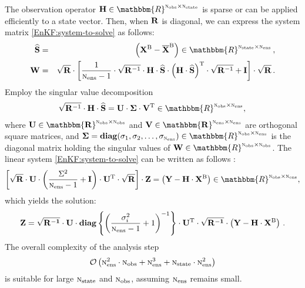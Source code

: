 \documentclass[12pt]{article}
\newcommand{\Nobs}{\textsc{n}_{{\rm obs}}}
\newcommand{\Nens}{\textsc{n}_{{\rm ens}}}
\newcommand{\Nstate}{\textsc{n}_{{\rm state}}}
\newcommand{\BO}{{\mathcal O}}
\newcommand{\XB}{{\bf X}^{\rm B}}
\newcommand{\Xmean}{{\bf \overline{X}}^{\rm B}}
\newcommand{\R}{{\bf R}}
\renewcommand{\S}{{\bf S}}
\newcommand{\Z}{{\bf Z}}
\newcommand{\Y}{{\bf Y}}
\newcommand{\Lo}{{\bf H}}
\renewcommand{\Re}{\mathbbm{R}}
\begin{document}
The observation operator $\Lo \in \Re^{\Nobs \times \Nstate}$ is sparse or can be applied efficiently to a state vector. Then, when $\R$ is diagonal, we can express the system matrix \eqref{EnKF:system-to-solve} as follows:
\begin{eqnarray}
\nonumber
\widehat{\S} &=& \left ( \XB-\Xmean \right ) \in \Re^{\Nstate \times \Nens}\,,\\
\label{EnKF:SVD-rewritten-W}
\displaystyle {\bf W} &=& \sqrt{\R} \cdot \left [ \frac{1}{\Nens-1} \cdot \sqrt{\R^{-1}} \cdot \Lo \cdot \widehat{\S} \cdot \left( \Lo \cdot \widehat{\S} \right )^{\rm T} \cdot \sqrt{\R^{-1}} + {\bf I} \right ] \cdot \sqrt{\R}\,.
\end{eqnarray}
Employ the singular value decomposition
\begin{eqnarray}
\label{EnKF:SVD-single-value-decomposition}
\displaystyle \sqrt{\R^{-1}} \cdot \Lo \cdot \widehat{\S}= {\bf U} \cdot {\bf \Sigma} \cdot {\bf V^{\rm T}} \in \Re^{\Nobs \times \Nens},\,
\end{eqnarray}
where ${\bf U \in \Re^{\Nobs \times \Nobs}}$ and ${\bf V \in \Re^{\Nens \times \Nens}}$ are orthogonal square matrices, and ${\bf \Sigma} = {\bf diag}(\sigma_1,\sigma_2,\ldots,\sigma_{\Nens}) \in \Re^{\Nobs \times \Nens}$ is the diagonal matrix holding the singular values of ${\bf W} \in \Re^{\Nobs \times \Nobs}$. The linear system \eqref{EnKF:system-to-solve} can be written as follows \cite{Jan06}:
\begin{eqnarray}
\label{EnKF:SVD-linear-system-rewritten}
\displaystyle \left[{\sqrt{\R}} \cdot {\bf U} \cdot \left( \frac{\Sigma^2}{\Nens-1} + {\bf I} \right ) \cdot {\bf U^{\rm T}} \cdot {\sqrt{\R}} \right ] \cdot \Z = \left ( {{\Y}-{\Lo}  \cdot {\XB}} \right ) \in \Re^{\Nobs \times \Nens},
\end{eqnarray}
which yields the solution:
\begin{eqnarray}
\label{SVD:solution-linear-system}
\displaystyle \Z = \sqrt{\bf R^{-1}} \cdot {\bf U} \cdot {\bf diag} \left\{ \left( \frac{\sigma^2_i}{\Nens-1}+1 \right)^{-1} \right\} \cdot {\bf U^{\rm T}} \cdot \sqrt{\bf R^{-1}} \cdot  \left ( {{\Y}-{\Lo}  \cdot {\XB}} \right )\,.
\end{eqnarray}
The overall complexity of the analysis step
\begin{eqnarray}
\label{EnKF:SVD-overall-complexity}
\displaystyle \BO \left( \Nens^2 \cdot \Nobs + \Nens^3 + \Nstate \cdot \Nens^2 \right )
\end{eqnarray}
is suitable for large $\Nstate$ and $\Nobs$, assuming $\Nens$ remains small.
\end{document}
